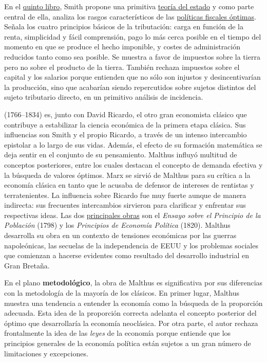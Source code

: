 \documentclass{nuevotema}
\begin{document}
En el \underline{quinto libro}, Smith propone una primitiva \underline{teoría del estado} y como parte central de ella, analiza los rasgos característicos de las \underline{políticas fiscales óptimas}. Señala los cuatro principios básicos de la tributación: carga en función de la renta, simplicidad y fácil comprensión, pago lo más cerca posible en el tiempo del momento en que se produce el hecho imponible, y costes de administración reducidos tanto como sea posible. Se muestra a favor de impuestos sobre la tierra pero no sobre el producto de la tierra. También rechaza impuestos sobre el capital y los salarios porque entienden que no sólo son injustos y desincentivarían la producción, sino que acabarían siendo repercutidos sobre sujetos distintos del sujeto tributario directo, en un primitivo análisis de incidencia.

(1766--1834) es, junto con David Ricardo, el otro gran economista clásico que contribuye a estabilizar la ciencia económica de la primera etapa clásica. Sus influencias son Smith y el propio Ricardo, a través de un intenso intercambio epistolar a lo largo de sus vidas. Además, el efecto de su formación matemática se deja sentir en el conjunto de su pensamiento. Malthus influyó multitud de conceptos posteriores, entre los cuales destacan el concepto de demanda efectiva y la búsqueda de valores óptimos. Marx se sirvió de Malthus para su crítica a la economía clásica en tanto que le acusaba de defensor de intereses de rentistas y terratenientes. La influencia sobre Ricardo fue muy fuerte aunque de manera indirecta: sus frecuentes intercambios sirvieron para clarificar y enfrentar sus respectivas ideas. Las dos \underline{principales obras} son el \textit{Ensayo sobre el Principio de la Población} (1798) y los \textit{Principios de Economía Política} (1820). Malthus desarrolla su obra en un contexto de tensiones económicas por las guerras napoleónicas, las secuelas de la independencia de EEUU y los problemas sociales que comienzan a hacerse evidentes como resultado del desarrollo industrial en Gran Bretaña. 

En el plano \textbf{metodológico}, la obra de Malthus es significativa por sus diferencias con la metodología de la mayoría de los clásicos. En primer lugar, Malthus muestra una tendencia a entender la economía como la búsqueda de la proporción adecuada. Esta idea de la proporción correcta adelanta el concepto posterior del óptimo que desarrollaría la economía neoclásica. Por otra parte, el autor rechaza frontalmente la idea de las \textit{leyes} de la economía porque entiende que los principios generales de la economía política están sujetos a un gran número de limitaciones y excepciones. 
\end{document}
